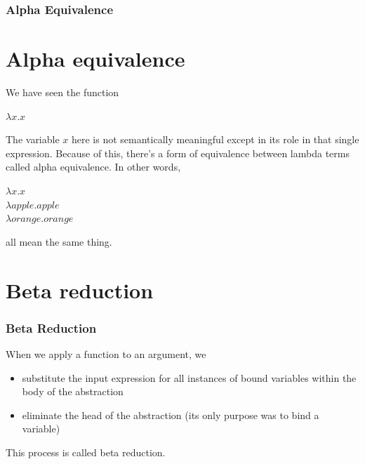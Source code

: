 \documentclass{beamer}
\begin{document}
\begin{frame}
\frametitle{Alpha Equivalence}

\section{Alpha equivalence}

We have seen the function
\begin{center}
$\lambda x.x$
\end{center}
The variable $x$ here is not semantically meaningful except in its role in that single expression. Because of this, there’s a form of equivalence between lambda terms called alpha equivalence. In other words, 
\begin{center}
$\lambda x.x$ \\

$\lambda apple.apple$\\

$\lambda orange.orange$\\
\end{center}
all mean the same thing. 
\end{frame}
\section{Beta reduction}
\begin{frame} [fragile, label = test]
    \frametitle{Beta Reduction}

When we apply a function to an argument, we 
\begin{itemize}
\item substitute the input expression for all instances of bound variables within the body of the abstraction
\item eliminate the head of the abstraction (its only purpose was to bind a variable)
\end{itemize}
This process is called beta reduction.

\end{frame}
\end{document}
